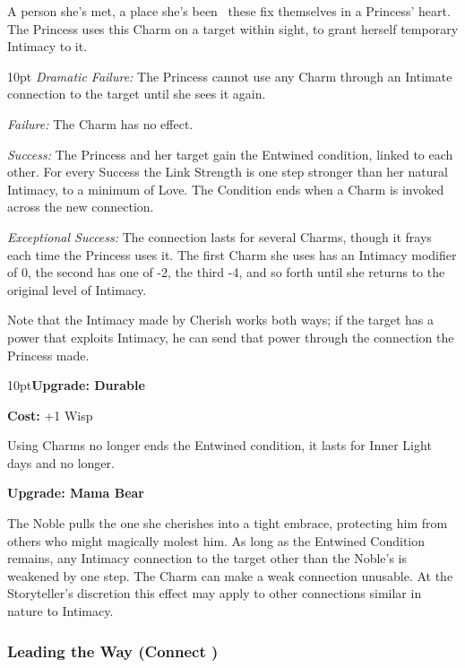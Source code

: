 \noindent A person she's met, a place she's been \textendash\, these fix themselves in a Princess' heart. The Princess uses this Charm on a target within sight, to grant herself temporary Intimacy to it.

   \begin{myindentpar}{10pt} \emph{Dramatic Failure:} The Princess cannot use any Charm through an Intimate connection to the target until she sees it again.
   
    \emph{Failure:} The Charm has no effect.
	
    \emph{Success:} The Princess and her target gain the Entwined condition, linked to each other. For every Success the Link Strength is one step stronger than her natural Intimacy, to a minimum of Love. The Condition ends when a Charm is invoked across the new connection. 
	
    \emph{Exceptional Success:} The connection lasts for several Charms, though it frays each time the Princess uses it. The first Charm she uses has an Intimacy modifier of 0, the second has one of -2, the third -4, and so forth until she returns to the original level of Intimacy.\end{myindentpar}

\noindent Note that the Intimacy made by Cherish works both ways; if the target has a power that exploits Intimacy, he can send that power through the connection the Princess made.

\begin{myindentpar}{10pt}\textbf{Upgrade: Durable}

\noindent \textbf{Cost:} +1 Wisp

\noindent Using Charms no longer ends the Entwined condition, it lasts for Inner Light days and no longer. 

\textbf{Upgrade: Mama Bear}

The Noble pulls the one she cherishes into a tight embrace, protecting him from others who might magically molest him. As long as the Entwined Condition remains, any Intimacy connection to the target other than the Noble’s is weakened by one step. The Charm can make a weak connection unusable. At the Storyteller's discretion this effect may apply to other connections similar in nature to Intimacy.

\end{myindentpar}

\subsubsection*{Leading the Way (Connect \textbullet\textbullet\textbullet)}

